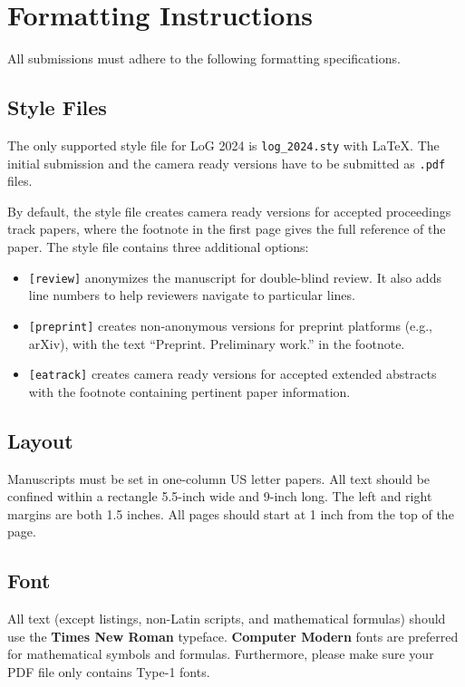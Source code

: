 \documentclass{article}
\begin{document}
\section{Formatting Instructions}

All submissions must adhere to the following formatting specifications.

\subsection{Style Files}

The only supported style file for LoG 2024 is \verb+log_2024.sty+ with \LaTeX.
The initial submission and the camera ready versions have to be submitted as \texttt{.pdf} files.

By default, the style file creates camera ready versions for accepted proceedings track papers, where the footnote in the first page gives the full reference of the paper.
The style file contains three additional options:
\begin{itemize}
	\item \verb+[review]+ anonymizes the manuscript for double-blind review. It also adds line numbers to help reviewers navigate to particular lines.
	\item \verb+[preprint]+ creates non-anonymous versions for preprint platforms (e.g., arXiv), with the text ``Preprint. Preliminary work.'' in the footnote.
	\item \verb+[eatrack]+ creates camera ready versions for accepted extended abstracts with the footnote containing pertinent paper information.
\end{itemize}

\subsection{Layout}
Manuscripts must be set in one-column US letter papers.
All text should be confined within a rectangle 5.5-inch wide and 9-inch long.
The left and right margins are both 1.5 inches.
All pages should start at 1 inch from the top of the page.

\subsection{Font}
All text (except listings, non-Latin scripts, and mathematical formulas) should use the \textbf{Times New Roman} typeface.
\textbf{Computer Modern} fonts are preferred for mathematical symbols and formulas.
Furthermore, please make sure your PDF file only contains Type-1 fonts.
\end{document}
